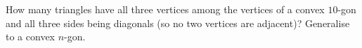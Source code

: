 How many triangles have all three vertices among the vertices of a convex $10$-gon and all three sides being diagonals (so no two vertices are adjacent)? Generalise to a convex $n$-gon.
